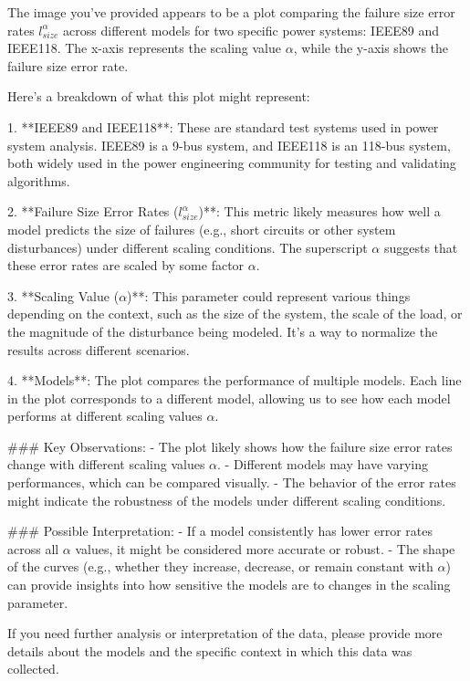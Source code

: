 The image you've provided appears to be a plot comparing the failure size error rates \( l_{size}^\alpha \) across different models for two specific power systems: IEEE89 and IEEE118. The x-axis represents the scaling value \(\alpha\), while the y-axis shows the failure size error rate.

Here's a breakdown of what this plot might represent:

1. **IEEE89 and IEEE118**: These are standard test systems used in power system analysis. IEEE89 is a 9-bus system, and IEEE118 is an 118-bus system, both widely used in the power engineering community for testing and validating algorithms.

2. **Failure Size Error Rates (\( l_{size}^\alpha \))**: This metric likely measures how well a model predicts the size of failures (e.g., short circuits or other system disturbances) under different scaling conditions. The superscript \(\alpha\) suggests that these error rates are scaled by some factor \(\alpha\).

3. **Scaling Value (\(\alpha\))**: This parameter could represent various things depending on the context, such as the size of the system, the scale of the load, or the magnitude of the disturbance being modeled. It's a way to normalize the results across different scenarios.

4. **Models**: The plot compares the performance of multiple models. Each line in the plot corresponds to a different model, allowing us to see how each model performs at different scaling values \(\alpha\).

### Key Observations:
- The plot likely shows how the failure size error rates change with different scaling values \(\alpha\).
- Different models may have varying performances, which can be compared visually.
- The behavior of the error rates might indicate the robustness of the models under different scaling conditions.

### Possible Interpretation:
- If a model consistently has lower error rates across all \(\alpha\) values, it might be considered more accurate or robust.
- The shape of the curves (e.g., whether they increase, decrease, or remain constant with \(\alpha\)) can provide insights into how sensitive the models are to changes in the scaling parameter.

If you need further analysis or interpretation of the data, please provide more details about the models and the specific context in which this data was collected.